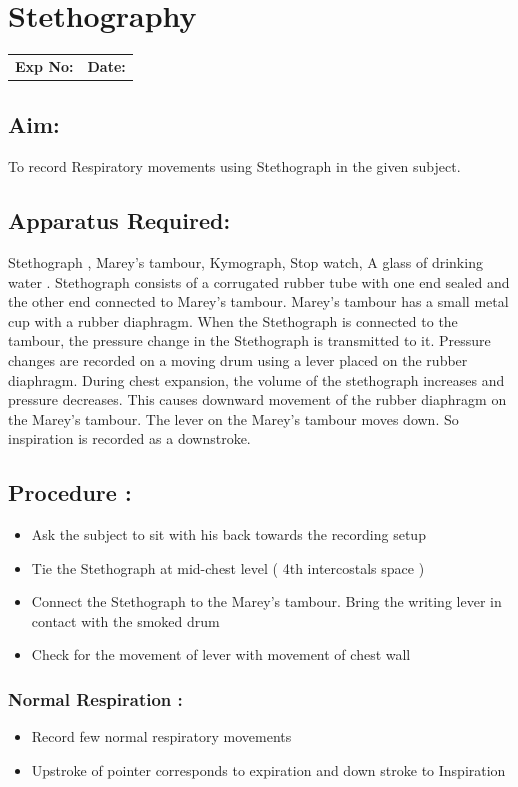 \documentclass[a4paper,12pt,openany,twoside]{book}
\begin{document}
															\chapter*{\centering Stethography}
															\begin{tabular}{p{5in} p{1in}}
																\textbf{Exp No:}  & \textbf{Date:}\\
															\end{tabular}
\section*{Aim:}
To record Respiratory movements using Stethograph in the given subject.
\section*{Apparatus Required:}
Stethograph , Marey’s tambour, Kymograph, Stop watch, A glass of drinking water .
Stethograph consists of a corrugated rubber tube with one end sealed and the other end connected to Marey’s tambour. Marey’s tambour has a small metal cup with a rubber diaphragm. When the Stethograph is connected to the tambour, the pressure change in the Stethograph is transmitted to it. Pressure changes are recorded on a moving drum using a lever placed on the rubber diaphragm. During chest expansion, the volume of the stethograph increases and pressure decreases. This causes downward movement of the rubber diaphragm on the Marey’s tambour. The lever on the Marey’s tambour moves down. So inspiration is recorded as a downstroke.
\section*{Procedure :}
\begin{itemize}
\item{Ask the subject to sit with his back towards the recording setup}
\item{Tie the Stethograph at mid-chest level ( 4th intercostals space )}
\item{Connect the Stethograph to the Marey’s tambour. Bring the writing lever in contact with the smoked drum}
\item{Check for the movement of lever with movement of chest wall}
\end{itemize}
\subsection*{Normal Respiration :}
\begin{itemize}
\item{Record few normal respiratory movements}
\item{Upstroke of pointer corresponds to expiration and down stroke to Inspiration}
\end{itemize}
\end{document}
